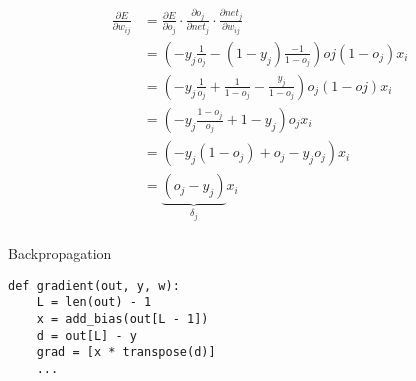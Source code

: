 \begin{frame}
  \begin{equation*}
    \begin{split}
      \frac{\partial E}{\partial w_{ij}} & = \frac{\partial E}{\partial o_j}
    \cdot \frac{\partial o_j}{\partial net_j} \cdot \frac{\partial
    net_j}{\partial w_{ij}} \\
    & = (-y_j \frac{1}{o_j} - (1 - y_j) \frac{-1}{1 - o_j}) oj(1 - o_j) x_i \\
    & = (-y_j \frac{1}{o_j} + \frac{1}{1 - o_j} - \frac{y_j}{1 - o_j}) o_j(1 - oj) x_i \\
    & = (-y_j \frac{1 - o_j}{o_j} + 1 - y_j) o_j x_i \\
    & = (-y_j (1 - o_j) + o_j - y_j o_j) x_i \\
    & = \underbrace{(o_j - y_j)}_{\delta_j} x_i \\
  \end{split}
\end{equation*}
\end{frame}

\begin{frame}[fragile]
  \begin{block}{Backpropagation}
    \begin{lstlisting}
def gradient(out, y, w):
    L = len(out) - 1
    x = add_bias(out[L - 1])
    d = out[L] - y
    grad = [x * transpose(d)]
    ...
    \end{lstlisting}
  \end{block}
\end{frame}

